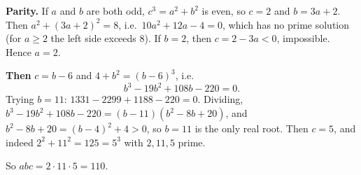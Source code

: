 \textbf{Parity.} If $a$ and $b$ are both odd, $c^3=a^2+b^2$ is even, so $c=2$ and $b=3a+2$. Then $a^2+(3a+2)^2=8$, i.e.\ $10a^2+12a-4=0$, which has no prime solution (for $a\ge2$ the left side exceeds $8$). If $b=2$, then $c=2-3a<0$, impossible. Hence $a=2$.

\textbf{Then} $c=b-6$ and $4+b^2=(b-6)^3$, i.e.
\[
b^3-19b^2+108b-220=0 .
\]
Trying $b=11$: $1331-2299+1188-220=0$. Dividing, $b^3-19b^2+108b-220=(b-11)\left(b^2-8b+20\right)$, and $b^2-8b+20=(b-4)^2+4>0$, so $b=11$ is the only real root. Then $c=5$, and indeed $2^2+11^2=125=5^3$ with $2,11,5$ prime.

So $abc=2\cdot11\cdot5=\boxed{110}$.

